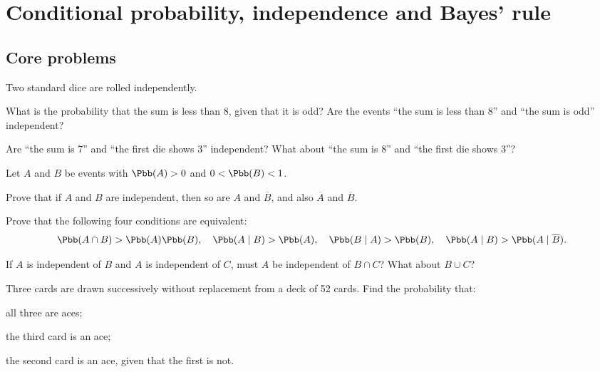 \section{Conditional probability, independence and Bayes' rule}
\subsection*{Core problems}
\begin{problembook}
Two standard dice are rolled independently.
\begin{enumeratea}
  \item What is the probability that the sum is less than 8, given that it is odd?
  Are the events ``the sum is less than 8'' and ``the sum is odd'' independent?
  \item Are ``the sum is 7'' and ``the first die shows 3'' independent?
  What about ``the sum is 8'' and ``the first die shows 3''?
\end{enumeratea}
\end{problembook}
\begin{problem}
Let $A$ and $B$ be events with $\Pbb(A)>0$ and $0<\Pbb(B)<1$.
\begin{enumeratea}
  \item Prove that if $A$ and $B$ are independent, then so are $A$ and $\overline{B}$,
  and also $\overline{A}$ and $\overline{B}$.
  \item Prove that the following four conditions are equivalent:
  \[
  \Pbb(A\cap B)>\Pbb(A)\Pbb(B),\quad
  \Pbb(A\mid B)>\Pbb(A),\quad
  \Pbb(B\mid A)>\Pbb(B),\quad
  \Pbb(A\mid B)>\Pbb(A\mid \overline{B}).
  \]
  \item If $A$ is independent of $B$ and $A$ is independent of $C$, must $A$ be
  independent of $B\cap C$? What about $B\cup C$?
\end{enumeratea}
\end{problem}
\begin{problembook}
Three cards are drawn successively without replacement from a deck of 52 cards.
Find the probability that:
\begin{enumeratea}
  \item all three are aces;
  \item the third card is an ace;
  \item the second card is an ace, given that the first is not.
\end{enumeratea}
\end{problembook}
